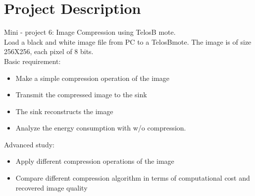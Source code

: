 
%

\section{Project Description}
Mini - project  6:  Image Compression using TelosB mote.\\
Load a black and white image file from PC to a TelosBmote. The image is of size 256X256, each pixel of 8 bits.\\

Basic requirement:
\begin{itemize}
\item Make a simple compression operation of the image
\item Transmit the compressed image to the sink
\item The sink reconstructs the image
\item Analyze the energy consumption with w/o compression. 
\end{itemize}

Advanced study:
\begin{itemize}
\item Apply different compression operations of the image
\item Compare different compression algorithm in terms of computational cost and recovered image quality
\end{itemize}

%
